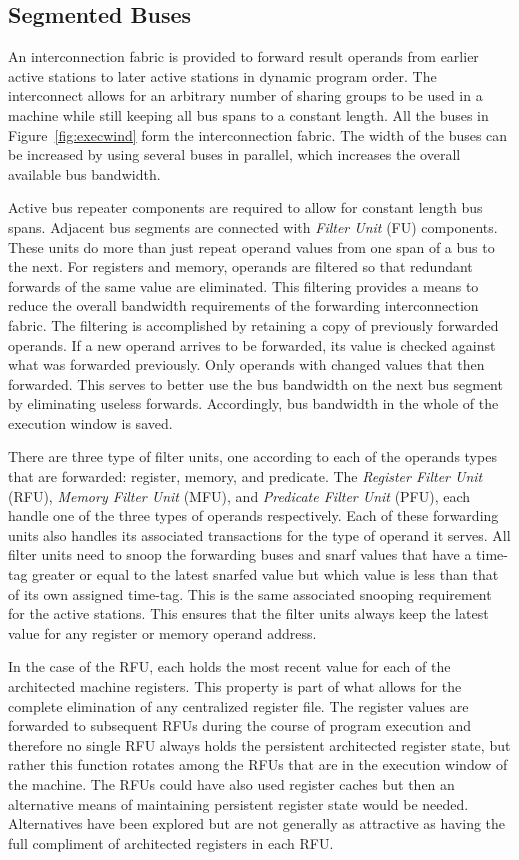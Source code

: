 \documentclass[10pt,twocolumn]{IEEEtran}
\begin{document}
\subsection {Segmented Buses}
\label{sec:segbus}
%
An interconnection fabric is provided to forward result operands from
earlier active stations to later active stations in dynamic program order.  
The
interconnect allows for an arbitrary number of sharing groups to be used
in a machine while still keeping all bus spans to a constant length.
All the buses in Figure~\ref{fig:execwind} form the interconnection
fabric.  The width of the buses can be increased by using several buses
in parallel, which increases the overall available bus bandwidth.

Active bus repeater components are required to allow for constant
length bus spans.  Adjacent bus segments are connected 
with \emph{F{il}ter Unit} (FU) components.  
These units do more than just repeat operand values from one
span of a bus to the next.  For registers and memory, operands are
f{il}tered so that redundant forwards of the same value are eliminated.
This f{il}tering provides a means to reduce the overall bandwidth
requirements of the forwarding interconnection fabric.
The f{il}tering is accomplished by retaining a copy of previously
forwarded operands.  If a new operand arrives to be forwarded,
its value is checked against what was forwarded previously.
Only operands with changed values that then forwarded.
This serves to better use the bus bandwidth on the next bus
segment by eliminating useless forwards.  Accordingly, bus bandwidth
in the whole of the execution window is saved.

There are three type of f{il}ter units, one according to each of the
operands types that are forwarded: register, memory, and predicate.
The \emph{Register F{il}ter Unit} (RFU), \emph{Memory F{il}ter
Unit} (MFU), and \emph{Predicate F{il}ter Unit} (PFU), each handle
one of the three types of operands respectively.
Each of these forwarding units also handles its
associated transactions for the type of operand it serves.
All f{il}ter units need to snoop the forwarding buses and snarf
values that have a time-tag greater or equal to the latest
snarfed value but which value is less than that of its own assigned
time-tag.  This is the same associated snooping requirement
for the active stations.
This ensures that the f{il}ter units always keep
the latest value for any register or memory operand address.

In the case of the RFU, each holds the most recent value
for each of the architected machine registers.  
This property is part of what allows for the complete elimination
of any centralized register f{il}e.
The
register values are forwarded to subsequent RFUs during the course of
program execution and therefore no single RFU always holds the
persistent architected register state, but rather this function rotates
among the RFUs that are in the execution window of the machine.
The RFUs could have also used register caches but then an alternative
means of maintaining persistent register state would be needed.
Alternatives have been explored but are not generally as attractive
as having the full compliment of architected registers in each RFU.
\end{document}
